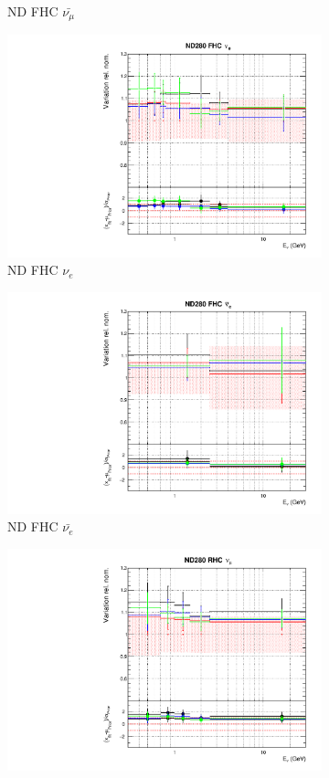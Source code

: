 \begin{figure}[t]
\begin{subfigure}{0.24\textwidth}
  \caption{ND FHC $\bar{\nu_{\mu}}$}
\end{subfigure}
\begin{subfigure}{0.24\textwidth}
  \centering
  \includegraphics[width=0.95\linewidth]{figs/detcovbinflux_2}
  \caption{ND FHC $\nu_e$}
\end{subfigure}
\begin{subfigure}{0.24\textwidth}
  \centering
  \includegraphics[width=0.95\linewidth]{figs/detcovbinflux_3}
  \caption{ND FHC $\bar{\nu_{e}}$}
\end{subfigure}
\begin{subfigure}{0.24\textwidth}
  \centering
  \includegraphics[width=0.95\linewidth]{figs/detcovbinflux_4}

\end{subfigure}
\end{figure}
